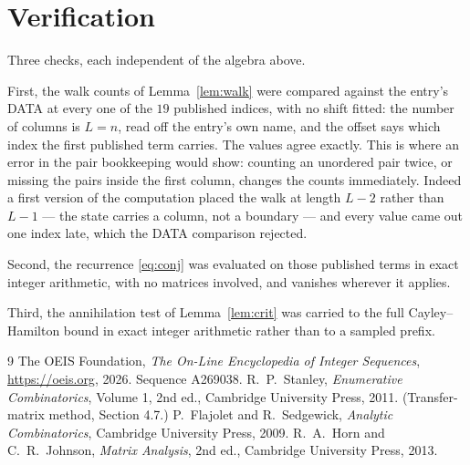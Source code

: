 \documentclass[11pt,a4paper]{article}
\theoremstyle{plain}
\theoremstyle{definition}
\begin{document}
\section{Verification}

Three checks, each independent of the algebra above.

First, the walk counts of Lemma~\ref{lem:walk} were compared against the entry's DATA at
every one of the $19$ published indices, with no shift fitted: the number of columns is
$L=n$, read off the entry's own name, and the offset says which index the first
published term carries. The values agree exactly. This is where an error in the pair
bookkeeping would show: counting an unordered pair twice, or missing the pairs inside the
first column, changes the counts immediately. Indeed a first version of the computation
placed the walk at length $L-2$ rather than $L-1$ --- the state carries a column, not a
boundary --- and every value came out one index late, which the DATA comparison rejected.

Second, the recurrence \eqref{eq:conj} was evaluated on those published terms in exact
integer arithmetic, with no matrices involved, and vanishes wherever it applies.

Third, the annihilation test of Lemma~\ref{lem:crit} was carried to the full
Cayley--Hamilton bound in exact integer arithmetic rather than to a sampled prefix.

\begin{thebibliography}{9}
 The OEIS Foundation, \emph{The On-Line Encyclopedia of Integer
Sequences}, \url{https://oeis.org}, 2026. Sequence A269038.
 R.~P.~Stanley, \emph{Enumerative Combinatorics}, Volume 1, 2nd ed.,
Cambridge University Press, 2011. (Transfer-matrix method, Section 4.7.)
 P.~Flajolet and R.~Sedgewick, \emph{Analytic Combinatorics}, Cambridge
University Press, 2009.
 R.~A.~Horn and C.~R.~Johnson, \emph{Matrix Analysis}, 2nd ed., Cambridge
University Press, 2013.
\end{thebibliography}
\end{document}
